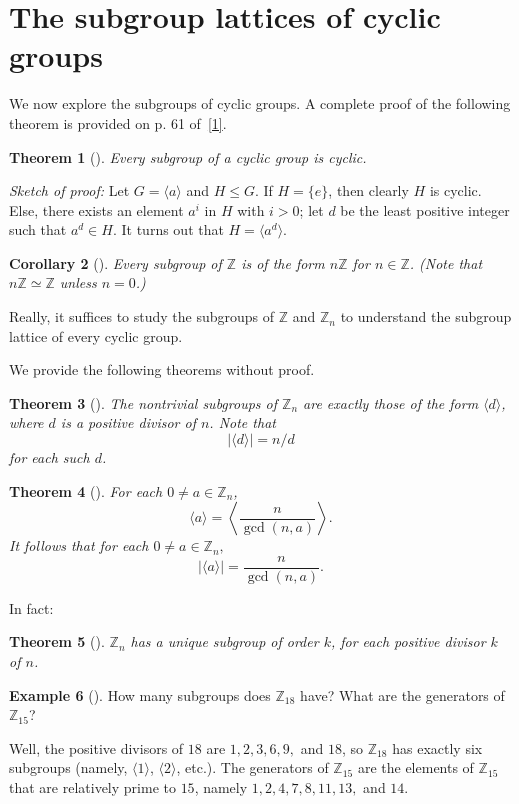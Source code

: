 \documentclass[10pt,]{book}
\theoremstyle{plain}
\newtheorem{theorem}{Theorem}[section]
\newtheorem{corollary}[theorem]{Corollary}
\theoremstyle{definition}
\theoremstyle{definition}
\theoremstyle{definition}
\newtheorem{example}[theorem]{Example}
\theoremstyle{definition}
\numberwithin{equation}{section}
\def\Z{\mathbb{Z}}
\begin{document}
\section[{The subgroup lattices of cyclic groups}]{The subgroup lattices of cyclic groups}\label{cyclattices}
We now explore the subgroups of cyclic groups. A complete proof of the following theorem is provided on p. 61 of~\hyperlink{F}{[1]}.%
\begin{theorem}[{}]\label{subc}
Every subgroup of a cyclic group is cyclic.%
\end{theorem}
\emph{Sketch of proof:} Let \(G=\langle a\rangle\) and \(H\leq G\). If \(H=\{e\}\), then clearly \(H\) is cyclic. Else, there exists an element \(a^i\) in \(H\) with \(i>0\); let \(d\) be the least positive integer such that \(a^d\in H\). It turns out that \(H=\langle a^d\rangle\).%
\begin{corollary}[{}]\label{corollary-5}
Every subgroup of \(\Z\) is of the form \(n\Z\) for \(n\in \Z\). (Note that \(n\Z\simeq \Z\) unless \(n=0\).)%
\end{corollary}
Really, it suffices to study the subgroups of \(\Z\) and \(\Z_n\) to understand the subgroup lattice of every cyclic group.%
\par
We provide the following theorems without proof.%
\begin{theorem}[{}]\label{znsubgps}
The nontrivial subgroups of \(\Z_n\) are exactly those of the form \(\langle d\rangle\), where \(d\) is a positive divisor of \(n\). Note that%
\begin{equation*}
|\langle d\rangle |=n/d
\end{equation*}
for each such \(d\).%
\end{theorem}
\begin{theorem}[{}]\label{theorem-33}
For each \(0\neq a\in \Z_n\),%
\begin{equation*}
\langle a\rangle =\left\langle \frac{n}{\gcd(n,a)}\right\rangle.
\end{equation*}
It follows that for each \(0\neq a \in \Z_n,\)%
\begin{equation*}
|\langle a\rangle |=\frac{n}{\gcd(n,a)}.
\end{equation*}
%
\end{theorem}
In fact:%
\begin{theorem}[{}]\label{theorem-34}
\(\Z_n\) has a unique subgroup of order \(k\), for each positive divisor \(k\) of \(n\).%
\end{theorem}
\begin{example}[]\label{example-47}
How many subgroups does \(\Z_{18}\) have? What are the generators of \(\Z_{15}\)?%
\par
Well, the positive divisors of \(18\) are \(1,2,3,6,9,\) and \(18\), so \(\Z_{18}\) has exactly six subgroups (namely, \(\langle 1\rangle\), \(\langle 2\rangle\), etc.). The generators of \(\Z_{15}\) are the elements of \(\Z_{15}\) that are relatively prime to \(15\), namely \(1,2,4,7,8,11,13,\) and \(14\).%
\end{example}
\end{document}
